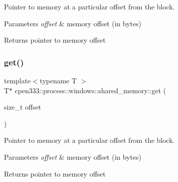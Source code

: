 Pointer to memory at a particular offset from the block. 


\begin{DoxyParams}{Parameters}
{\em offset} & memory offset (in bytes) \\
\hline
\end{DoxyParams}
\begin{DoxyReturn}{Returns}
pointer to memory offset 
\end{DoxyReturn}
\mbox{\label{classcpen333_1_1process_1_1windows_1_1shared__memory_a2f2fa53c705df531b6126ed2da84c347}} 
\subsubsection{\texorpdfstring{get()}{get()}\hspace{0.1cm}{\footnotesize\ttfamily [2/3]}}
{\footnotesize\ttfamily template$<$typename T $>$ \\
T$\ast$ cpen333\+::process\+::windows\+::shared\+\_\+memory\+::get (\begin{DoxyParamCaption}\item[{size\+\_\+t}]{offset }\end{DoxyParamCaption})\hspace{0.3cm}{\ttfamily [inline]}}



Pointer to memory at a particular offset from the block. 


\begin{DoxyParams}{Parameters}
{\em offset} & memory offset (in bytes) \\
\hline
\end{DoxyParams}
\begin{DoxyReturn}{Returns}
pointer to memory offset 
\end{DoxyReturn}
\mbox{\label{classcpen333_1_1process_1_1windows_1_1shared__memory_a3986cdc917b26ab1ab608f59270a47c5}} 

